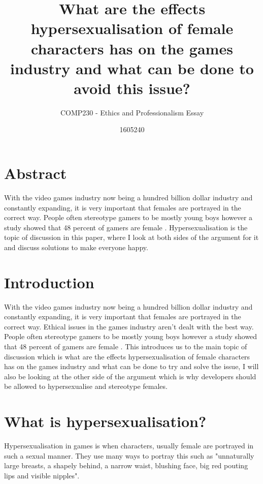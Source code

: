 \documentclass{scrartcl}
\title{What are the effects hypersexualisation of female characters has on the games industry and what can be done to avoid this issue?}
\subtitle{COMP230 - Ethics and Professionalism Essay}
\author{1605240}
\begin{document}
\maketitle

\section{Abstract}
With the video games industry now being a hundred billion dollar industry \cite{bowey2017don} and constantly expanding, it is very important that females are portrayed in the correct way. People often stereotype gamers to be mostly young boys however a study showed that 48 percent of gamers are female \cite{heron2014sexism}. Hypersexualisation is the topic of discussion in this paper, where I look at both sides of the argument for it and discuss solutions to make everyone happy.
\newpage

\section{Introduction}
With the video games industry now being a hundred billion dollar industry \cite{bowey2017don} and constantly expanding, it is very important that females are portrayed in the correct way. Ethical issues in the games industry aren't dealt with the best way\cite{flick2016ask}. People often stereotype gamers to be mostly young boys however a study showed that 48 percent of gamers are female \cite{heron2014sexism}. This introduces us to the main topic of discussion which is what are the effects hypersexualisation of female characters has on the games industry and what can be done to try and solve the issue, I will also be looking at the other side of the argument which is why developers should be allowed to hypersexualise and stereotype  females.

\section{What is hypersexualisation?}
Hypersexualisation in games is when characters, usually female are portrayed in such a sexual manner. They use many ways to portray this such as "unnaturally large breasts, a shapely behind, a narrow waist, blushing face, big red pouting lips and visible nipples"\cite{waern2005hypersexual}.
\end{document}
